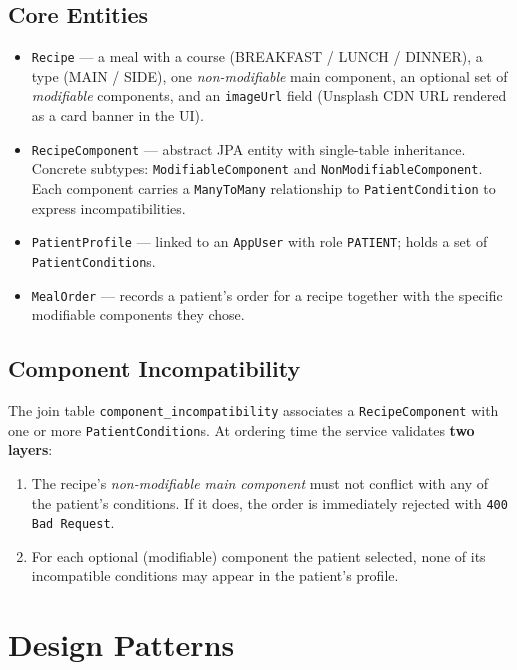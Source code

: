 \documentclass[12pt,a4paper]{article}
\begin{document}
\subsection{Core Entities}
\begin{itemize}[noitemsep]
  \item \texttt{Recipe} — a meal with a course (BREAKFAST / LUNCH / DINNER), a type
        (MAIN / SIDE), one \emph{non-modifiable} main component, an optional
        set of \emph{modifiable} components, and an \texttt{imageUrl} field
        (Unsplash CDN URL rendered as a card banner in the UI).
  \item \texttt{RecipeComponent} — abstract JPA entity with single-table inheritance.
        Concrete subtypes: \texttt{ModifiableComponent} and \texttt{NonModifiableComponent}.
        Each component carries a \texttt{ManyToMany} relationship to
        \texttt{PatientCondition} to express incompatibilities.
  \item \texttt{PatientProfile} — linked to an \texttt{AppUser} with role
        \texttt{PATIENT}; holds a set of \texttt{PatientCondition}s.
  \item \texttt{MealOrder} — records a patient's order for a recipe together with
        the specific modifiable components they chose.
\end{itemize}

\subsection{Component Incompatibility}
The join table \texttt{component\_incompatibility} associates a
\texttt{RecipeComponent} with one or more \texttt{PatientCondition}s.
At ordering time the service validates \textbf{two layers}:
\begin{enumerate}[noitemsep]
  \item The recipe's \emph{non-modifiable main component} must not conflict with any
        of the patient's conditions.  If it does, the order is immediately rejected
        with \texttt{400 Bad Request}.
  \item For each optional (modifiable) component the patient selected, none of its
        incompatible conditions may appear in the patient's profile.
\end{enumerate}

\section{Design Patterns}
\end{document}
